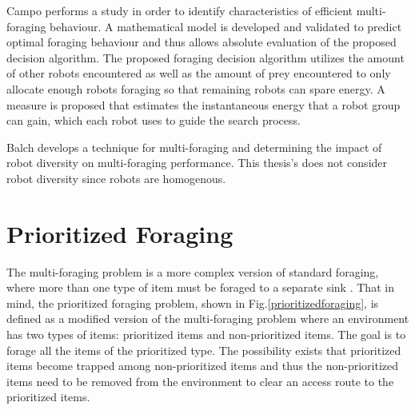 
Campo \cite{campo2007efficient} performs a study in order to identify characteristics of efficient multi-foraging behaviour.  A mathematical model is developed and validated to predict optimal foraging behaviour and thus allows absolute evaluation of the proposed decision algorithm. The proposed foraging decision algorithm utilizes the amount of other robots encountered as well as the amount of prey encountered to only allocate enough robots foraging  so that remaining robots can spare energy. A measure is proposed that estimates the instantaneous energy that a robot group can gain, which each robot uses to guide the search process. 

Balch \cite{balch1999impact} develops a technique for multi-foraging and determining the impact of robot diversity on multi-foraging performance. This thesis's does not consider robot diversity since robots are homogenous.



\section{Prioritized Foraging}
\label{sec:second:prioritizedforaging}


The multi-foraging problem is a more complex version of standard foraging, where more than one type of item must be foraged to a separate sink \cite{balch1999impact}. That in mind, the prioritized foraging problem, shown in Fig.\ref{prioritizedforaging}, is defined as a modified version of the multi-foraging problem where an environment has two types of items: prioritized items and non-prioritized items. The goal is to forage all the items of the prioritized type. The possibility exists that prioritized items become trapped among non-prioritized items and thus the non-prioritized items need to be removed from the environment to clear an access route to the prioritized items. 

